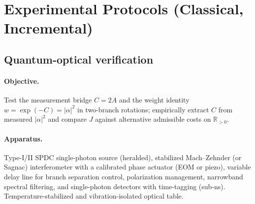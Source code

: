 \documentclass[12pt,a4paper]{article}
\begin{document}
\section{Experimental Protocols (Classical, Incremental)}

\subsection{Quantum-optical verification}
\paragraph{Objective.}
Test the measurement bridge $C=2A$ and the weight identity $w=\exp(-C)=|\alpha|^{2}$ in two-branch rotations; empirically extract $C$ from measured $|\alpha|^{2}$ and compare $J$ against alternative admissible costs on $\mathbb{R}_{>0}$.

\paragraph{Apparatus.}
Type-I/II SPDC single-photon source (heralded), stabilized Mach–Zehnder (or Sagnac) interferometer with a calibrated phase actuator (EOM or piezo), variable delay line for branch separation control, polarization management, narrowband spectral filtering, and single-photon detectors with time-tagging (sub-ns). Temperature-stabilized and vibration-isolated optical table.
\end{document}
